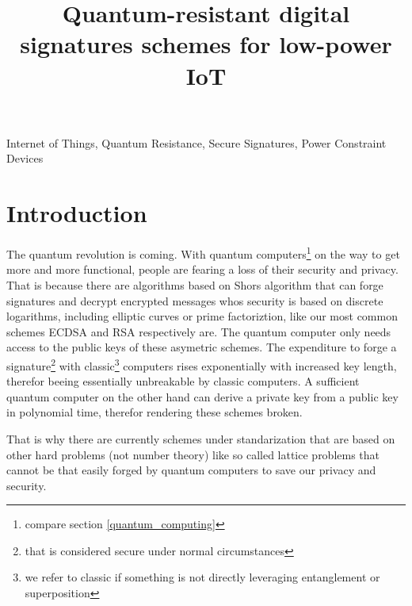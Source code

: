 \documentclass[conference]{IEEEtran}
\begin{document}
\title{Quantum-resistant digital signatures schemes for low-power IoT}

\author{
}

\maketitle

\begin{abstract}
\end{abstract}

\begin{IEEEkeywords}
Internet of Things, Quantum Resistance, Secure Signatures, Power Constraint Devices
\end{IEEEkeywords}


\section{Introduction}
The quantum revolution is coming. With quantum computers\footnote{compare section \ref{quantum_computing}} on the way to get more and more functional, people are fearing a loss of their security and privacy.
That is because there are algorithms based on Shors algorithm that can forge signatures and decrypt encrypted messages whos security is based on discrete logarithms, including elliptic curves or prime factoriztion, like our most common schemes ECDSA and RSA respectively are.
The quantum computer only needs access to the public keys of these asymetric schemes.
The expenditure to forge a signature\footnote{that is considered secure under normal circumstances 
} with classic\footnote{we refer to classic if something is not directly leveraging entanglement or superposition} computers rises exponentially with increased key length, therefor beeing essentially unbreakable by classic computers.
A sufficient quantum computer on the other hand can derive a private key from a public key in polynomial time, therefor rendering these schemes broken.

That is why there are currently schemes under standarization\cite{PQClean-GH} that are based on other hard problems (not number theory) like so called lattice problems that cannot be that easily forged by quantum computers to save our privacy and security.
\end{document}
